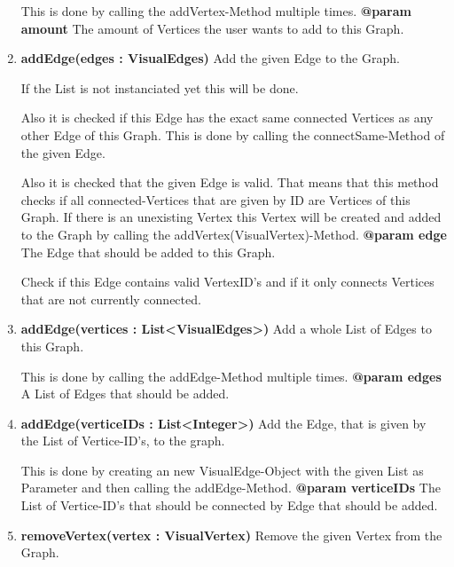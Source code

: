 \begin{enumerate}[+]
{						This is done by calling the addVertex-Method multiple times.
						\newline
						\textbf{@param amount}
							The amount of Vertices the user wants to add to this Graph.
							\newline
					}
					\item{
						\textbf{addEdge(edges : VisualEdges)} \newline
						Add the given Edge to the Graph.
						
						If the List is not instanciated yet this will be done.
						
						Also it is checked if this Edge has the exact same connected Vertices as any other Edge of this Graph.
						This is done by calling the connectSame-Method of the given Edge.
						
						Also it is checked that the given Edge is valid.
						That means that this method checks if all connected-Vertices that are given by ID are Vertices of this Graph.
						If there is an unexisting Vertex this Vertex will be created and added to the Graph by calling the addVertex(VisualVertex)-Method.
						\newline
						\textbf{@param edge}
							The Edge that should be added to this Graph.
							
							Check if this Edge contains valid VertexID's and if it only connects Vertices that are not currently connected.
							\newline
					}
					\item{
						\textbf{addEdge(vertices : List<VisualEdges>)} \newline
						Add a whole List of Edges to this Graph.
						
						This is done by calling the addEdge-Method multiple times.
						\newline
						\textbf{@param edges}
							A List of Edges that should be added.
							\newline
					}
					\item{
						\textbf{addEdge(verticeIDs : List<Integer>)} \newline
						Add the Edge, that is given by the List of Vertice-ID's, to the graph.
						
						This is done by creating an new VisualEdge-Object with the given List as Parameter and then calling the addEdge-Method.
						\newline
						\textbf{@param verticeIDs}
							The List of Vertice-ID's that should be connected by Edge that should be added.
							\newline
					}
					\item{
						\textbf{removeVertex(vertex : VisualVertex)} \newline
						Remove the given Vertex from the Graph.
						
}
\end{enumerate}
